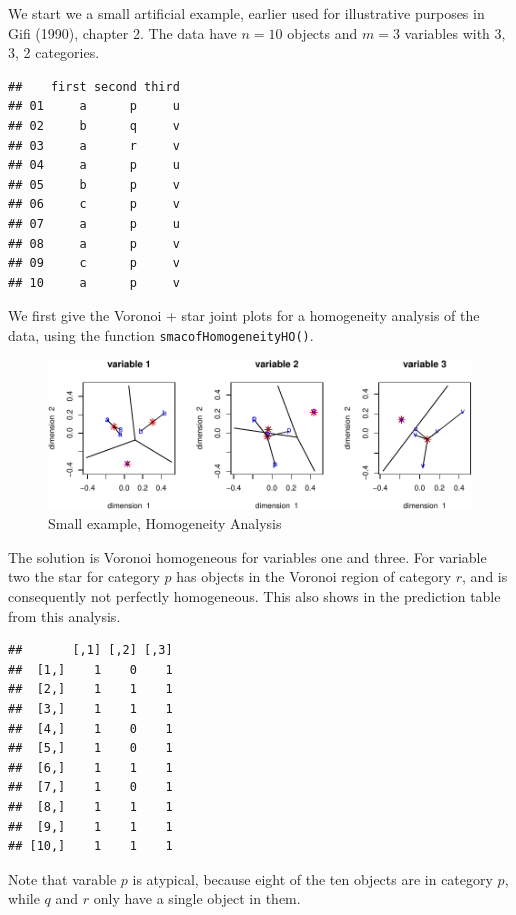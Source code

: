\documentclass[
  12pt,
]{article}
\begin{document}
We start we a small artificial example, earlier used for illustrative purposes in Gifi (1990), chapter 2. The data have \(n=10\) objects and
\(m=3\) variables with 3, 3, 2 categories.

\begin{verbatim}
##    first second third
## 01     a      p     u
## 02     b      q     v
## 03     a      r     v
## 04     a      p     u
## 05     b      p     v
## 06     c      p     v
## 07     a      p     u
## 08     a      p     v
## 09     c      p     v
## 10     a      p     v
\end{verbatim}

We first give the Voronoi + star joint plots for a homogeneity
analysis of the data, using the function \texttt{smacofHomogeneityHO()}.

\begin{figure}

{\centering \includegraphics{smacofHO_files/figure-latex/smallhomals-1} 

}

\caption{Small example, Homogeneity Analysis}\label{fig:smallhomals}
\end{figure}

The solution is Voronoi homogeneous for variables one and three. For
variable two the star for category \(p\) has objects in the Voronoi
region of category \(r\), and is consequently not perfectly homogeneous.
This also shows in the prediction table from this analysis.

\begin{verbatim}
##       [,1] [,2] [,3]
##  [1,]    1    0    1
##  [2,]    1    1    1
##  [3,]    1    1    1
##  [4,]    1    0    1
##  [5,]    1    0    1
##  [6,]    1    1    1
##  [7,]    1    0    1
##  [8,]    1    1    1
##  [9,]    1    1    1
## [10,]    1    1    1
\end{verbatim}

Note that varable \(p\) is atypical, because eight of the ten objects
are in category \(p\), while \(q\) and \(r\) only have a single object
in them.
\end{document}
